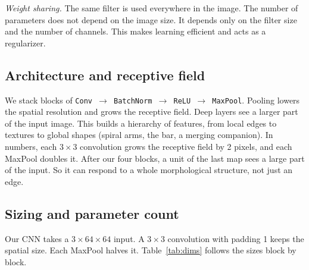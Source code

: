 \documentclass[11pt,a4paper]{article}
\newcommand{\code}[1]{\texttt{#1}}
\begin{document}
\emph{Weight sharing.} The same filter is used everywhere in the image. The number of
parameters does not depend on the image size. It depends only on the filter size and the
number of channels. This makes learning efficient and acts as a regularizer.

\begin{center}
\end{center}

\subsection{Architecture and receptive field}

We stack blocks of \code{Conv $\to$ BatchNorm $\to$ ReLU $\to$ MaxPool}. Pooling lowers the
spatial resolution and grows the receptive field. Deep layers see a larger part of the input
image. This builds a hierarchy of features, from local edges to textures to global shapes
(spiral arms, the bar, a merging companion). In numbers, each $3\times3$ convolution grows
the receptive field by 2 pixels, and each MaxPool doubles it. After our four blocks, a unit
of the last map sees a large part of the input. So it can respond to a whole morphological
structure, not just an edge.

\subsection{Sizing and parameter count}

Our CNN takes a $3\times64\times64$ input. A $3\times3$ convolution with padding 1 keeps the
spatial size. Each MaxPool halves it. Table~\ref{tab:dims} follows the sizes block by block.
\end{document}
